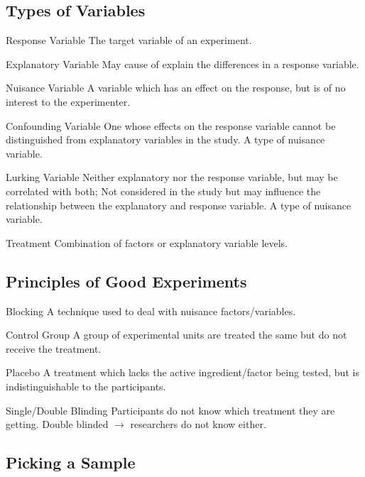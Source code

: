 \documentclass[]{article}
\newenvironment{definitions}{
	\begin{description}[font=\sffamily\bfseries, leftmargin=1cm, style=nextline]
	}{
	\end{description}
}
\begin{document}
	\subsection{Types of Variables}
	\begin{definitions}
		\item[Response Variable]
		The target variable of an experiment.
		\item[Explanatory Variable]
		May cause of explain the differences in a response variable.
		\item[Nuisance Variable]
		A variable which has an effect on the response, but is of no interest to the experimenter.
		\item[Confounding Variable]
		One whose effects on the response variable cannot be distinguished from explanatory variables in the study. A type of nuisance variable.
		\item[Lurking Variable]
		Neither explanatory nor the response variable, but may be correlated with both; Not considered in the study but may influence the relationship between the explanatory and response variable. A type of nuisance variable.
		\item[Treatment]
		Combination of factors or explanatory variable levels.
	\end{definitions}
	\subsection{Principles of Good Experiments}
	\begin{definitions}
		\item[Blocking]
		A technique used to deal with nuisance factors/variables.
		\item[Control Group]
		A group of experimental units are treated the same but do not receive the treatment.
		\item[Placebo]
		A treatment which lacks the active ingredient/factor being tested, but is indistinguishable to the participants.
		\item[Single/Double Blinding]
		Participants do not know which treatment they are getting. Double blinded $\rightarrow$ researchers do not know either.
	\end{definitions}
	\subsection{Picking a Sample}
\end{document}
